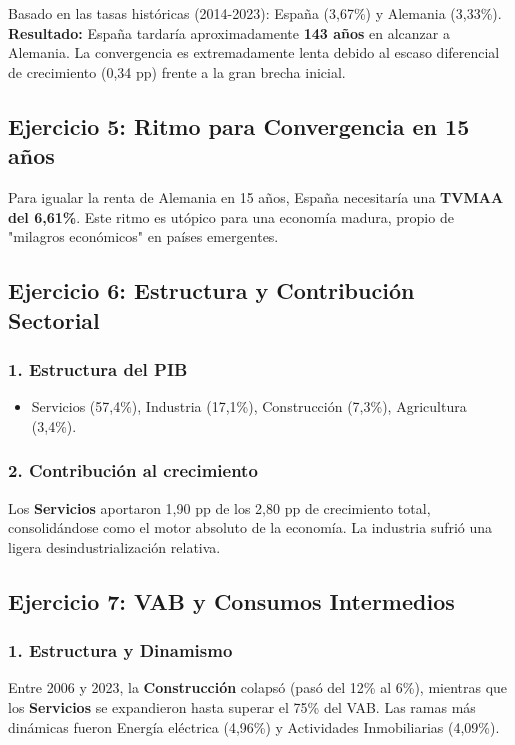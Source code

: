 Basado en las tasas históricas (2014-2023): España (3,67\%) y Alemania (3,33\%).
\textbf{Resultado:} España tardaría aproximadamente \textbf{143 años} en alcanzar a Alemania. La convergencia es extremadamente lenta debido al escaso diferencial de crecimiento (0,34 pp) frente a la gran brecha inicial.

\subsection{Ejercicio 5: Ritmo para Convergencia en 15 años}

Para igualar la renta de Alemania en 15 años, España necesitaría una \textbf{TVMAA del 6,61\%}. Este ritmo es utópico para una economía madura, propio de "milagros económicos" en países emergentes.

\subsection{Ejercicio 6: Estructura y Contribución Sectorial}

\subsubsection{1. Estructura del PIB}
\begin{itemize}
    \item Servicios (57,4\%), Industria (17,1\%), Construcción (7,3\%), Agricultura (3,4\%).
\end{itemize}

\subsubsection{2. Contribución al crecimiento}
Los \textbf{Servicios} aportaron 1,90 pp de los 2,80 pp de crecimiento total, consolidándose como el motor absoluto de la economía. La industria sufrió una ligera desindustrialización relativa.

\subsection{Ejercicio 7: VAB y Consumos Intermedios}

\subsubsection{1. Estructura y Dinamismo}
Entre 2006 y 2023, la \textbf{Construcción} colapsó (pasó del 12\% al 6\%), mientras que los \textbf{Servicios} se expandieron hasta superar el 75\% del VAB. Las ramas más dinámicas fueron Energía eléctrica (4,96\%) y Actividades Inmobiliarias (4,09\%).

